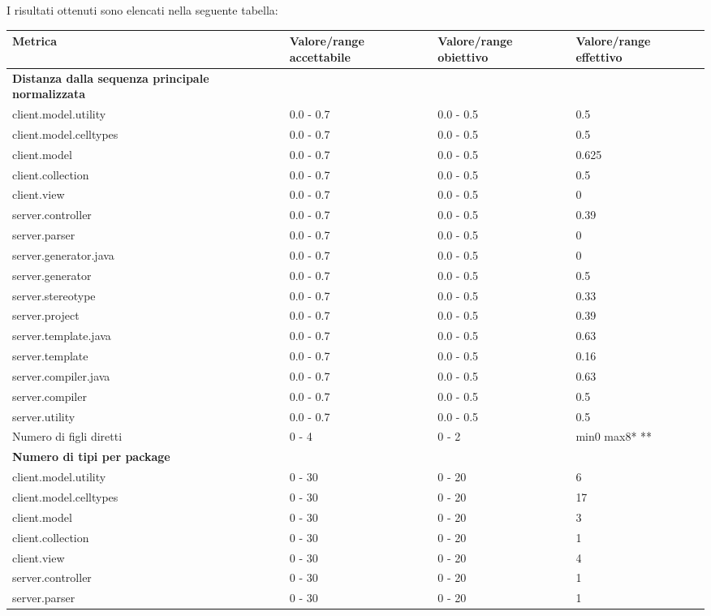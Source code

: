 		I risultati ottenuti sono elencati nella seguente tabella:
		\begin{longtable}{|p{5.5cm}|p{2.25cm}|p{2.25cm}|p{2.25cm}|}
		\hline
		\textbf{Metrica} 		 					&\textbf{Valore/range accettabile}	&\textbf{Valore/range obiettivo}	&\textbf{Valore/range effettivo}\\
		\hline
		\textbf{Distanza dalla sequenza principale normalizzata} & & &\\
		client.model.utility &0.0 - 0.7 &0.0 - 0.5 &0.5\\
		client.model.celltypes &0.0 - 0.7 &0.0 - 0.5 &0.5\\
		client.model &0.0 - 0.7 &0.0 - 0.5 &0.625\\
		client.collection &0.0 - 0.7 &0.0 - 0.5 &0.5\\
		client.view &0.0 - 0.7 &0.0 - 0.5 &0\\
		server.controller &0.0 - 0.7 &0.0 - 0.5 &0.39\\
		server.parser  &0.0 - 0.7 &0.0 - 0.5 &0\\
		server.generator.java  &0.0 - 0.7 &0.0 - 0.5 &0\\
		server.generator &0.0 - 0.7 &0.0 - 0.5 &0.5\\
		server.stereotype  &0.0 - 0.7 &0.0 - 0.5 &0.33\\
		server.project  &0.0 - 0.7 &0.0 - 0.5 &0.39\\
		server.template.java  &0.0 - 0.7 &0.0 - 0.5 &0.63\\
		server.template  &0.0 - 0.7 &0.0 - 0.5 &0.16\\
		server.compiler.java  &0.0 - 0.7 &0.0 - 0.5 &0.63\\
		server.compiler  &0.0 - 0.7 &0.0 - 0.5 &0.5\\
		server.utility  &0.0 - 0.7 &0.0 - 0.5 &0.5\\
		\hline
		Numero di figli diretti &0 - 4 &0 - 2 &min0 max8* **\\
		\hline
		\textbf{Numero di tipi per package} & & &\\
		client.model.utility &0 - 30 &0 - 20 &6\\
		client.model.celltypes &0 - 30 &0 - 20 &17\\
		client.model &0 - 30 &0 - 20 &3\\
		client.collection &0 - 30 &0 - 20 &1\\
		client.view &0 - 30 &0 - 20 &4\\
		server.controller &0 - 30 &0 - 20 &1\\
		server.parser &0 - 30 &0 - 20 &1\\

\end{longtable}
